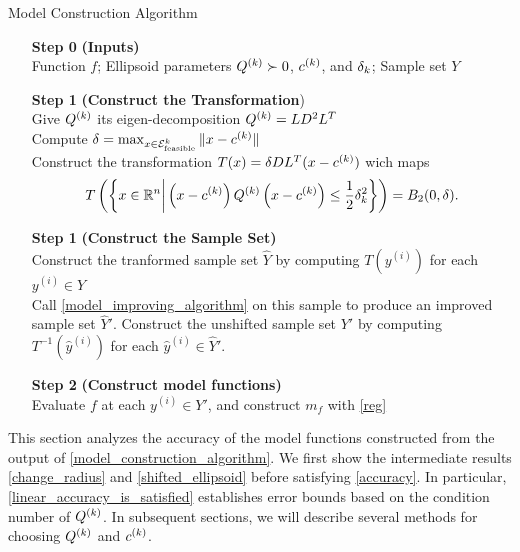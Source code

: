 \begin{algorithm}[H]
    \caption{Model Construction Algorithm}
    \label{model_construction_algorithm}
    \begin{itemize}
        \item[\textbf{Step 0}] \textbf{(Inputs)} \\
			Function $f$;
			Ellipsoid parameters ${Q^{(k)}} \succ 0$, $c^{(k)}$, and $\delta_k$;
        	Sample set $Y$
        \item[\textbf{Step 1}] \textbf{(Construct the Transformation}) \\
        	Give ${Q^{(k)}}$ its eigen-decomposition ${Q^{(k)}} = LD^2L^T$  \\
        	Compute $\delta = \max_{x \in {\mathcal E^k_{\textrm{feasible}}}} \|x - c^{(k)}\|$\\
			Construct the transformation $T(x) = \delta D L^T(x - c^{(k)})$ wich maps 
\begin{align*}
	T\left(\left\{x \in \mathbb R^n \bigg | \left(x - c^{(k)}\right) {Q^{(k)}} \left(x -c^{(k)}\right) \le \frac 1 2 \delta_k^2\right\}\right) = B_2(0, \delta).
\end{align*}
        \item[\textbf{Step 1}] \textbf{(Construct the Sample Set)} \\
        Construct the tranformed sample set $\hat Y$ by computing $T\left(y^{(i)}\right)$ for each $y^{(i)} \in Y$ \\
        Call \cref{model_improving_algorithm} on this sample to produce an improved sample set $\hat Y '$.
        Construct the unshifted sample set $Y'$ by computing $T^{-1}\left(\hat y^{(i)}\right)$ for each $\hat y^{(i)} \in \hat Y'$.
        \item[\textbf{Step 2}] \textbf{(Construct model functions)} \\
        Evaluate $f$ at each $y^{(i)} \in Y'$, and construct $m_f$ with \cref{reg}
    \end{itemize}
\end{algorithm}

This section analyzes the accuracy of the model functions constructed from the output of \cref{model_construction_algorithm}.
We first show the intermediate results \cref{change_radius} and \cref{shifted_ellipsoid} 
before satisfying \cref{accuracy}.
In particular, \cref{linear_accuracy_is_satisfied} establishes error bounds based on the condition number of ${Q^{(k)}}$.
In subsequent sections, we will describe several methods for choosing ${Q^{(k)}}$ and $c^{(k)}$.

